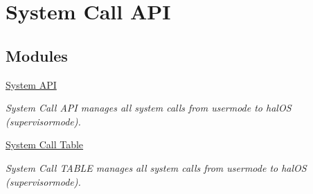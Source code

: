 \hypertarget{group___s_y_s_t_e_m___c_a_l_l___a_p_i}{
\section{System Call API}
\label{group___s_y_s_t_e_m___c_a_l_l___a_p_i}
}
\subsection*{Modules}
\begin{CompactItemize}
\item 
\hyperlink{group___h_s_y_s_t_e_m___a_p_i}{System API}
\begin{CompactList}\small\item\em System Call API manages all system calls from usermode to halOS (supervisormode). \item\end{CompactList}

\item 
\hyperlink{group___s_y_s_t_e_m___c_a_l_l___t_a_b_l_e}{System Call Table}
\begin{CompactList}\small\item\em System Call TABLE manages all system calls from usermode to halOS (supervisormode). \item\end{CompactList}

\end{CompactItemize}
